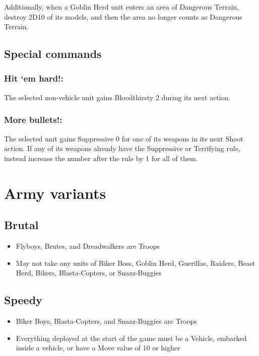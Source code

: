Additionally, when a Goblin Herd unit enters an area of Dangerous Terrain, destroy 2D10 of its models, and then the area no longer counts as Dangerous Terrain.

\subsection*{Special commands}
\subsubsection*{Hit ‘em hard!:} The selected non-vehicle unit gains Bloodthirsty 2 during its next action.

\subsubsection*{More bullets!:} The selected unit gains Suppressive 0 for one of its weapons in its next Shoot action. If any of its weapons already have the Suppressive or Terrifying rule, instead increase the number after the rule by 1 for all of them.


\section*{Army variants}
\subsection*{Brutal}
\begin{itemize}
    \item Flyboys, Brutes, and Dreadwalkers are Troops
    \item May not take any units of Biker Boss, Goblin Herd, Guerillas, Raiders, Beast Herd, Bikers, Blasta-Copters, or Snazz-Buggies
\end{itemize}

\subsection*{Speedy}
\begin{itemize}
    \item Biker Boys, Blasta-Copters, and Snazz-Buggies are Troops
    \item Everything deployed at the start of the game must be a Vehicle, embarked inside a vehicle, or have a Move value of 10 or higher
\end{itemize}




